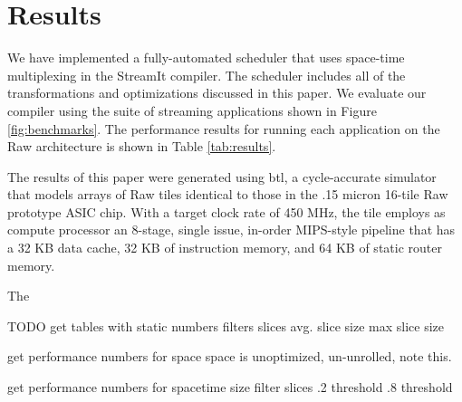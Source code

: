 \section{Results}
\label{sec:results}

We have implemented a fully-automated scheduler that uses space-time
multiplexing in the StreamIt compiler.  The scheduler includes all of
the transformations and optimizations discussed in this paper.  We
evaluate our compiler using the suite of streaming applications shown
in Figure \ref{fig:benchmarks}.  The performance results for running
each application on the Raw architecture is shown in Table
\ref{tab:results}.

The results of this paper were generated using btl, a cycle-accurate
simulator that models arrays of Raw tiles identical to those in the
.15 micron 16-tile Raw prototype ASIC chip.  With a target clock rate
of 450 MHz, the tile employs as compute processor an 8-stage, single
issue, in-order MIPS-style pipeline that has a 32 KB data cache, 32 KB
of instruction memory, and 64 KB of static router memory.



The 

TODO
get tables with static numbers
	filters
	slices
	avg. slice size
	max slice size

get performance numbers for space
	space is unoptimized, un-unrolled, note this.

get performance numbers for spacetime 
	size filter slices
	.2 threshold
	.8 threshold

